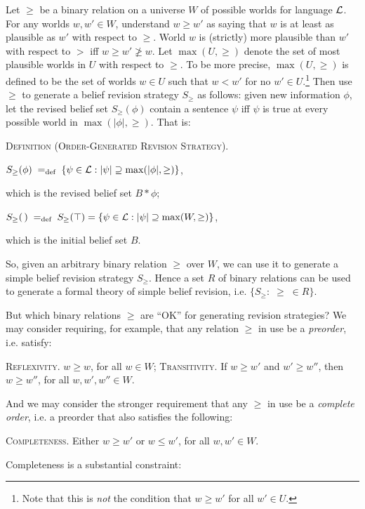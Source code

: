 Let $\ge$ be a binary relation on a universe $W$ of possible worlds for language ${\cal L}$. For any worlds $w, w' \in W$, understand $w \ge w'$ as saying that $w$ is at least as plausible as $w'$ with respect to $\ge$. World $w$ is (strictly) more plausible than $w'$ with respect to $>$ iff $w \ge w' \not\geq w$. Let $\max(U, \ge)$ denote the set of most plausible worlds in $U$ with respect to $\ge$. To be more precise, $\max(U, \ge)$ is defined to be the set of worlds $w \in U$ such that $w < w'$ for no $w' \in U$.\footnote
	{
	Note that this is {\em not} the condition that $w \geq w'$ for all $w' \in U$.
	} 
Then use $\ge$ to generate a belief revision strategy $S_{\ge}$ as follows: given new information $\phi$, let the revised belief set $S_{\ge}(\phi)$ contain a sentence $\psi$ iff $\psi$ is true at every possible world in $\max(|\phi|, \ge)$. That is: \op

	\xm \textsc{Definition (Order-Generated Revision Strategy).} 
	
	\xm $S_{\ge}(\phi) \;=_\text{def}\; \{\psi \in {\cal L}: |\psi| \supseteq \max(|\phi|, \ge) \}$, 
	
		\op\xm which is the revised belief set $B * \phi$; \ed

	\xm $S_{\ge}(\,) \;=_\text{def}\; S_{\ge}(\top) = \{\psi \in {\cal L}: |\psi| \supseteq \max(W, \ge) \}$, 
	
		\op\xm which is the initial belief set $B$. \ed

\ed So, given an arbitrary binary relation $\ge$ over $W$, we can use it to generate a simple belief revision strategy $S_{\ge}$. Hence a set $R$ of binary relations can be used to generate a formal theory of simple belief revision, i.e. $\{S_{\ge}: \;\ge\; \in R\}$. 

But which binary relations $\ge$ are ``OK'' for generating revision strategies? We may consider requiring, for example, that any relation $\ge$ in use be a {\em preorder}, i.e. satisfy: \op

	\xm \textsc{Reflexivity.} $w \ge w$, for all $w \in W$;
	\xm \textsc{Transitivity.} If $w \ge w'$ and $w' \ge w''$, then $w \ge w''$, for all $w, w', w'' \in W$.

\ed And we may consider the stronger requirement that any $\ge$ in use be a {\em complete order}, i.e. a preorder that also satisfies the following: \op

	\xm \textsc{Completeness.} Either $w \ge w'$ or $w \le w'$, for all $w, w' \in W$.

\ed Completeness is a substantial constraint: \op

